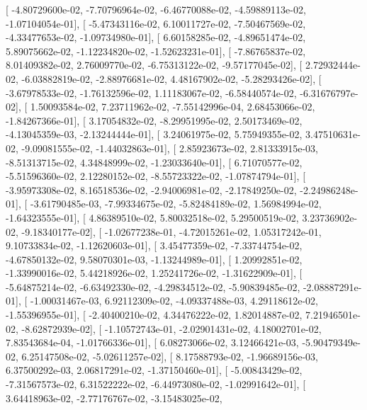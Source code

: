 \documentclass{article}
\begin{document}
       [ -4.80729600e-02,  -7.70796964e-02,  -6.46770088e-02,
         -4.59889113e-02,  -1.07104054e-01],
       [ -5.47343116e-02,   6.10011727e-02,  -7.50467569e-02,
         -4.33477653e-02,  -1.09734980e-01],
       [  6.60158285e-02,  -4.89651474e-02,   5.89075662e-02,
         -1.12234820e-02,  -1.52623231e-01],
       [ -7.86765837e-02,   8.01409382e-02,   2.76009770e-02,
         -6.75313122e-02,  -9.57177045e-02],
       [  2.72932444e-02,  -6.03882819e-02,  -2.88976681e-02,
          4.48167902e-02,  -5.28293426e-02],
       [ -3.67978533e-02,  -1.76132596e-02,   1.11183067e-02,
         -6.58440574e-02,  -6.31676797e-02],
       [  1.50093584e-02,   7.23711962e-02,  -7.55142996e-04,
          2.68453066e-02,  -1.84267366e-01],
       [  3.17054832e-02,  -8.29951995e-02,   2.50173469e-02,
         -4.13045359e-03,  -2.13244444e-01],
       [  3.24061975e-02,   5.75949355e-02,   3.47510631e-02,
         -9.09081555e-02,  -1.44032863e-01],
       [  2.85923673e-02,   2.81333915e-03,  -8.51313715e-02,
          4.34848999e-02,  -1.23033640e-01],
       [  6.71070577e-02,  -5.51596360e-02,   2.12280152e-02,
         -8.55723322e-02,  -1.07874794e-01],
       [ -3.95973308e-02,   8.16518536e-02,  -2.94006981e-02,
         -2.17849250e-02,  -2.24986248e-01],
       [ -3.61790485e-03,  -7.99334675e-02,  -5.82484189e-02,
          1.56984994e-02,  -1.64323555e-01],
       [  4.86389510e-02,   5.80032518e-02,   5.29500519e-02,
          3.23736902e-02,  -9.18340177e-02],
       [ -1.02677238e-01,  -4.72015261e-02,   1.05317242e-01,
          9.10733834e-02,  -1.12620603e-01],
       [  3.45477359e-02,  -7.33744754e-02,  -4.67850132e-02,
          9.58070301e-03,  -1.13244989e-01],
       [  1.20992851e-02,  -1.33990016e-02,   5.44218926e-02,
          1.25241726e-02,  -1.31622909e-01],
       [ -5.64875214e-02,  -6.63492330e-02,  -4.29834512e-02,
         -5.90839485e-02,  -2.08887291e-01],
       [ -1.00031467e-03,   6.92112309e-02,  -4.09337488e-03,
          4.29118612e-02,  -1.55396955e-01],
       [ -2.40400210e-02,   4.34476222e-02,   1.82014887e-02,
          7.21946501e-02,  -8.62872939e-02],
       [ -1.10572743e-01,  -2.02901431e-02,   4.18002701e-02,
          7.83543684e-04,  -1.01766336e-01],
       [  6.08273066e-02,   3.12466421e-03,  -5.90479349e-02,
          6.25147508e-02,  -5.02611257e-02],
       [  8.17588793e-02,  -1.96689156e-03,   6.37500292e-03,
          2.06817291e-02,  -1.37150460e-01],
       [ -5.00843429e-02,  -7.31567573e-02,   6.31522222e-02,
         -6.44973080e-02,  -1.02991642e-01],
       [  3.64418963e-02,  -2.77176767e-02,  -3.15483025e-02,
\end{document}
